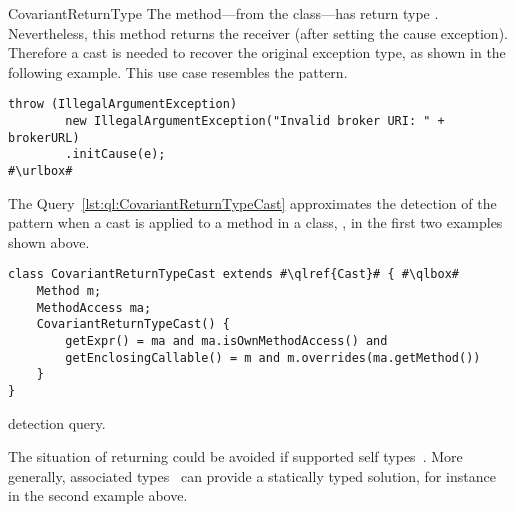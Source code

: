 \begin{pattern}{CovariantReturnType}
The  method---from the  class---has return type .
Nevertheless, this method returns the receiver (after setting the cause exception).
Therefore a cast is needed to recover the original exception type,
as shown in the following example.
This use case resembles the  pattern.

\def\urlvar{http://bit.ly/apache_activemq_2EnSivc}
\begin{verbatim}
throw (IllegalArgumentException)
        new IllegalArgumentException("Invalid broker URI: " + brokerURL)
        .initCause(e);
#\urlbox#
\end{verbatim}


\detection{}
The Query~\ref{lst:ql:CovariantReturnTypeCast} approximates the detection of the \thisp{} pattern when a cast is applied to a method in a  class, \eg{},
in the first two examples shown above.

\begin{listing}
\begin{verbatim}	
class CovariantReturnTypeCast extends #\qlref{Cast}# { #\qlbox#
	Method m;
	MethodAccess ma;
	CovariantReturnTypeCast() {
		getExpr() = ma and ma.isOwnMethodAccess() and
		getEnclosingCallable() = m and m.overrides(ma.getMethod())
	}
}
\end{verbatim}
\caption{\thisp{} detection query.}
\label{lst:ql:CovariantReturnTypeCast}
\end{listing}


\issues{}
The situation of returning  could be avoided if \java{} supported self types~\citep{bruceChallengingTypingIssues2003}.
More generally, associated types~\citep{chakravartyAssociatedTypeSynonyms2005} can provide a statically typed solution,
for instance in the second example above.

\end{pattern}
